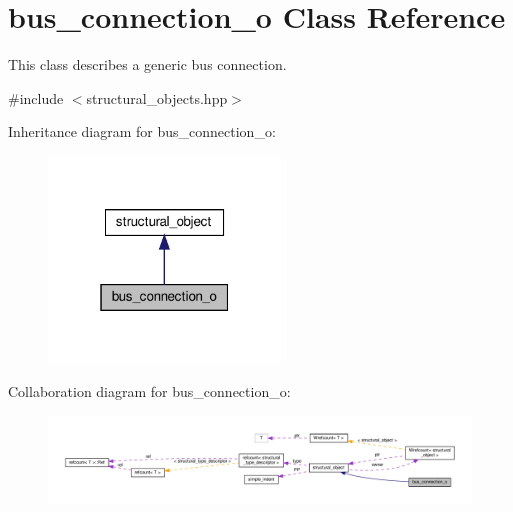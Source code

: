 \hypertarget{classbus__connection__o}{}\section{bus\+\_\+connection\+\_\+o Class Reference}
\label{classbus__connection__o}


This class describes a generic bus connection.  




{\ttfamily \#include $<$structural\+\_\+objects.\+hpp$>$}



Inheritance diagram for bus\+\_\+connection\+\_\+o\+:
\nopagebreak
\begin{figure}[H]
\begin{center}
\leavevmode
\includegraphics[width=175pt]{d0/d14/classbus__connection__o__inherit__graph}
\end{center}
\end{figure}


Collaboration diagram for bus\+\_\+connection\+\_\+o\+:
\nopagebreak
\begin{figure}[H]
\begin{center}
\leavevmode
\includegraphics[width=350pt]{d5/dc8/classbus__connection__o__coll__graph}
\end{center}
\end{figure}
